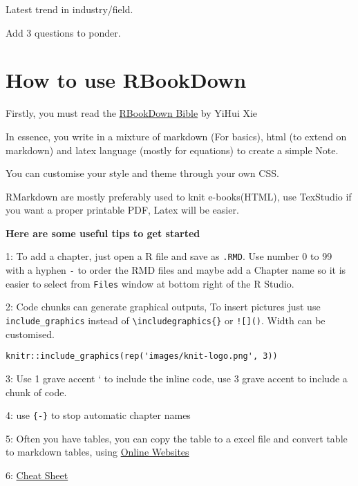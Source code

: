 \documentclass[
]{book}
\begin{document}
Latest trend in industry/field.

Add 3 questions to ponder.

\hypertarget{how-to-use-rbookdown}{%
\chapter*{How to use RBookDown}\label{how-to-use-rbookdown}}

Firstly, you must read the \href{https://bookdown.org/yihui/bookdown/}{RBookDown Bible} by YiHui Xie

In essence, you write in a mixture of markdown (For basics), html (to extend on markdown) and latex language (mostly for equations) to create a simple Note.

You can customise your style and theme through your own CSS.

RMarkdown are mostly preferably used to knit e-books(HTML), use TexStudio if you want a proper printable PDF, Latex will be easier.

\textbf{Here are some useful tips to get started}

1: To add a chapter, just open a R file and save as \texttt{.RMD}. Use number 0 to 99 with a hyphen \texttt{-} to order the RMD files and maybe add a Chapter name so it is easier to select from \texttt{Files} window at bottom right of the R Studio.

2: Code chunks can generate graphical outputs, To insert pictures just use \texttt{include\_graphics} instead of \texttt{\textbackslash{}includegraphics\{\}} or \texttt{!{[}{]}()}. Width can be customised.

\begin{verbatim}
knitr::include_graphics(rep('images/knit-logo.png', 3))
\end{verbatim}

3: Use 1 grave accent ` to include the inline code, use 3 grave accent to include a chunk of code.

4: use \texttt{\{-\}} to stop automatic chapter names

5: Often you have tables, you can copy the table to a excel file and convert table to markdown tables, using \href{https://www.tablesgenerator.com/markdown_tables}{Online Websites}

6: \href{https://www.rstudio.com/wp-content/uploads/2015/02/rmarkdown-cheatsheet.pdf}{Cheat Sheet}

  
\end{document}
